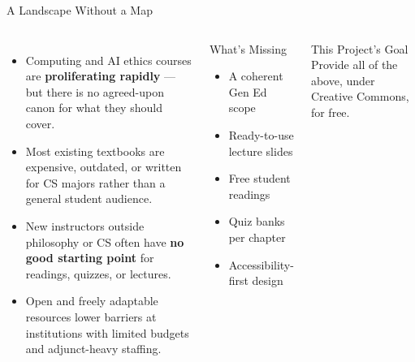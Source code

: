 \documentclass[aspectratio=169,10pt]{beamer}
\begin{document}
\begin{frame}{A Landscape Without a Map}
\begin{columns}[c]
\begin{itemize}
  \item Computing and AI ethics courses are \textbf{proliferating rapidly} --- but there is no agreed-upon canon for what they should cover.
  \item Most existing textbooks are expensive, outdated, or written for CS majors rather than a general student audience.
  \item New instructors outside philosophy or CS often have \textbf{no good starting point} for readings, quizzes, or lectures.
  \item Open and freely adaptable resources lower barriers at institutions with limited budgets and adjunct-heavy staffing.
\end{itemize}
\begin{block}{What's Missing}
\footnotesize
\begin{itemize}
  \item A coherent Gen Ed scope
  \item Ready-to-use lecture slides
  \item Free student readings
  \item Quiz banks per chapter
  \item Accessibility-first design
\end{itemize}
\end{block}
\vspace{0.25em}
\begin{exampleblock}{This Project's Goal}
\footnotesize Provide all of the above, under Creative Commons, for free.
\end{exampleblock}
\end{columns}
\end{frame}
\end{document}
